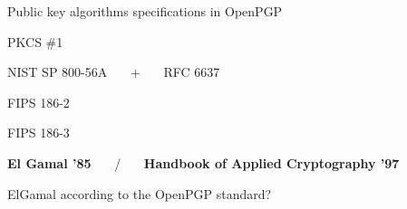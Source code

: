 \documentclass[aspectratio=169]{beamer}
\begin{document}
\begin{frame}{Public key algorithms specifications in OpenPGP}
  \large
  \begin{description}
    \setlength{\itemsep}{1em}
  \item[RSA ] PKCS \#1
  \item[ECDH ] NIST SP 800-56A ~~~+~~~ RFC 6637
  \item[DSA ] FIPS 186-2
  \item[ECDSA ] FIPS 186-3
  \item[ElGamal ] \textbf{El Gamal '85} ~~~/~~~ \textbf{Handbook of Applied Cryptography '97}
  \end{description}
\end{frame}


\begin{frame}{ElGamal according to the OpenPGP standard?}
  \centering
\end{frame}
\end{document}
